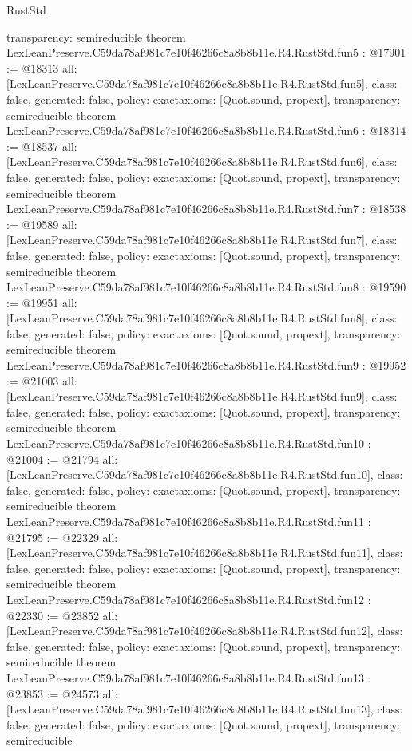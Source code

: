 \begin{lexlean}{RustStd}
\begin{coremodule}
{  transparency: semireducible
}
theorem LexLeanPreserve.C59da78af981c7e10f46266c8a8b8b11e.R4.RustStd.fun5 : @17901 := @18313 {
  all: [LexLeanPreserve.C59da78af981c7e10f46266c8a8b8b11e.R4.RustStd.fun5],
  class: false,
  generated: false,
  policy: exact{axioms: [Quot.sound, propext]},
  transparency: semireducible
}
theorem LexLeanPreserve.C59da78af981c7e10f46266c8a8b8b11e.R4.RustStd.fun6 : @18314 := @18537 {
  all: [LexLeanPreserve.C59da78af981c7e10f46266c8a8b8b11e.R4.RustStd.fun6],
  class: false,
  generated: false,
  policy: exact{axioms: [Quot.sound, propext]},
  transparency: semireducible
}
theorem LexLeanPreserve.C59da78af981c7e10f46266c8a8b8b11e.R4.RustStd.fun7 : @18538 := @19589 {
  all: [LexLeanPreserve.C59da78af981c7e10f46266c8a8b8b11e.R4.RustStd.fun7],
  class: false,
  generated: false,
  policy: exact{axioms: [Quot.sound, propext]},
  transparency: semireducible
}
theorem LexLeanPreserve.C59da78af981c7e10f46266c8a8b8b11e.R4.RustStd.fun8 : @19590 := @19951 {
  all: [LexLeanPreserve.C59da78af981c7e10f46266c8a8b8b11e.R4.RustStd.fun8],
  class: false,
  generated: false,
  policy: exact{axioms: [Quot.sound, propext]},
  transparency: semireducible
}
theorem LexLeanPreserve.C59da78af981c7e10f46266c8a8b8b11e.R4.RustStd.fun9 : @19952 := @21003 {
  all: [LexLeanPreserve.C59da78af981c7e10f46266c8a8b8b11e.R4.RustStd.fun9],
  class: false,
  generated: false,
  policy: exact{axioms: [Quot.sound, propext]},
  transparency: semireducible
}
theorem LexLeanPreserve.C59da78af981c7e10f46266c8a8b8b11e.R4.RustStd.fun10 : @21004 := @21794 {
  all: [LexLeanPreserve.C59da78af981c7e10f46266c8a8b8b11e.R4.RustStd.fun10],
  class: false,
  generated: false,
  policy: exact{axioms: [Quot.sound, propext]},
  transparency: semireducible
}
theorem LexLeanPreserve.C59da78af981c7e10f46266c8a8b8b11e.R4.RustStd.fun11 : @21795 := @22329 {
  all: [LexLeanPreserve.C59da78af981c7e10f46266c8a8b8b11e.R4.RustStd.fun11],
  class: false,
  generated: false,
  policy: exact{axioms: [Quot.sound, propext]},
  transparency: semireducible
}
theorem LexLeanPreserve.C59da78af981c7e10f46266c8a8b8b11e.R4.RustStd.fun12 : @22330 := @23852 {
  all: [LexLeanPreserve.C59da78af981c7e10f46266c8a8b8b11e.R4.RustStd.fun12],
  class: false,
  generated: false,
  policy: exact{axioms: [Quot.sound, propext]},
  transparency: semireducible
}
theorem LexLeanPreserve.C59da78af981c7e10f46266c8a8b8b11e.R4.RustStd.fun13 : @23853 := @24573 {
  all: [LexLeanPreserve.C59da78af981c7e10f46266c8a8b8b11e.R4.RustStd.fun13],
  class: false,
  generated: false,
  policy: exact{axioms: [Quot.sound, propext]},
  transparency: semireducible
}
\end{coremodule}
\end{lexlean}
